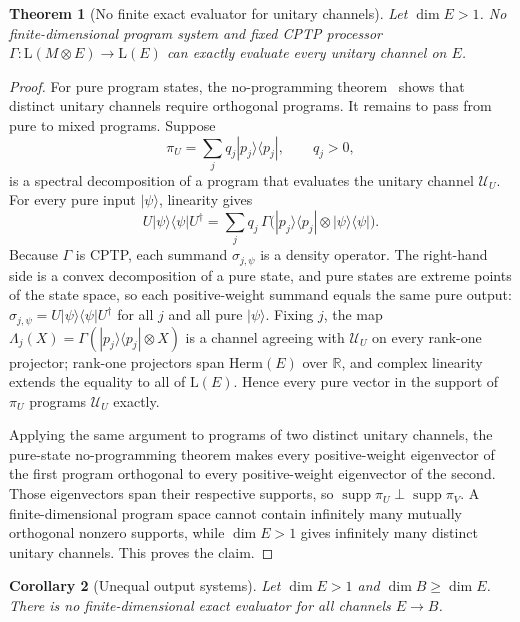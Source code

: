 \documentclass[11pt,a4paper]{article}
\newtheorem{theorem}{Theorem}[section]
\newtheorem{corollary}[theorem]{Corollary}
\newcommand{\Lin}{\mathrm{L}}
\newcommand{\Herm}{\mathrm{Herm}}
\newcommand{\supp}{\operatorname{supp}}
\begin{document}
\begin{theorem}[No finite exact evaluator for unitary channels]
\label{thm:no-programming}
Let $\dim E>1$. No finite-dimensional program system and fixed CPTP processor $\Gamma:\Lin(M\otimes E)\to\Lin(E)$ can exactly evaluate every unitary channel on $E$.
\end{theorem}

\begin{proof}
For pure program states, the no-programming theorem~\cite{NielsenChuang1997} shows that distinct unitary channels require orthogonal programs. It remains to pass from pure to mixed programs. Suppose
\[
\pi_U=\sum_jq_j|p_j\rangle\langle p_j|,\qquad q_j>0,
\]
is a spectral decomposition of a program that evaluates the unitary channel $\mathcal U_U$. For every pure input $|\psi\rangle$, linearity gives
\[
U|\psi\rangle\langle\psi|U^\dagger
=\sum_jq_j\,\Gamma\big(|p_j\rangle\langle p_j|\otimes|\psi\rangle\langle\psi|\big).
\]
Because $\Gamma$ is CPTP, each summand $\sigma_{j,\psi}$ is a density operator. The right-hand side is a convex decomposition of a pure state, and pure states are extreme points of the state space, so each positive-weight summand equals the same pure output: $\sigma_{j,\psi}=U|\psi\rangle\langle\psi|U^\dagger$ for all $j$ and all pure $|\psi\rangle$. Fixing $j$, the map $\Lambda_j(X)=\Gamma(|p_j\rangle\langle p_j|\otimes X)$ is a channel agreeing with $\mathcal U_U$ on every rank-one projector; rank-one projectors span $\Herm(E)$ over $\mathbb R$, and complex linearity extends the equality to all of $\Lin(E)$. Hence every pure vector in the support of $\pi_U$ programs $\mathcal U_U$ exactly.

Applying the same argument to programs of two distinct unitary channels, the pure-state no-programming theorem makes every positive-weight eigenvector of the first program orthogonal to every positive-weight eigenvector of the second. Those eigenvectors span their respective supports, so $\supp\pi_U\perp\supp\pi_V$. A finite-dimensional program space cannot contain infinitely many mutually orthogonal nonzero supports, while $\dim E>1$ gives infinitely many distinct unitary channels. This proves the claim.
\end{proof}

\begin{corollary}[Unequal output systems]
\label{cor:unequal}
Let $\dim E>1$ and $\dim B\ge\dim E$. There is no finite-dimensional exact evaluator for all channels $E\to B$.
\end{corollary}
\end{document}
